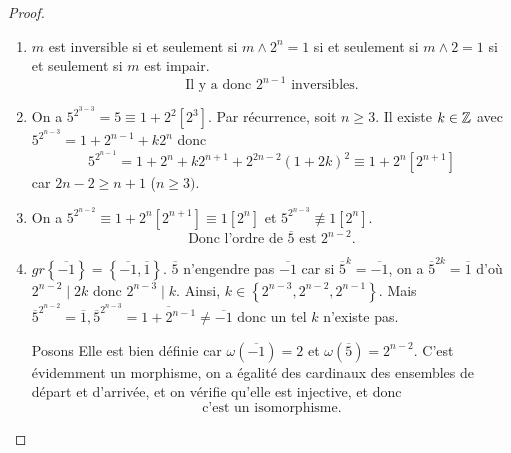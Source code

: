 \documentclass[12pt]{article}
\begin{document}
\begin{proof}
	\phantom{}
	\begin{enumerate}
		\item $m$ est inversible si et seulement si $m\wedge 2^{n}=1$ si et seulement si $m\wedge 2=1$ si et seulement si $m$ est impair. 
		\begin{equation}
			\boxed{\text{Il y a donc }2^{n-1}\text{ inversibles.}}
		\end{equation}
		\item On a $5^{2^{3-3}}=5\equiv1+2^{2}[2^{3}]$. Par récurrence, soit $n\geqslant3$. Il existe $k\in\mathbb{Z}$ avec $5^{2^{n-3}}=1+2^{n-1}+k2^{n}$ donc 
		\begin{equation}
			\boxed{
			5^{2^{n-1}}=1+2^{n}+k2^{n+1}+2^{2n-2}(1+2k)^{2}\equiv 1+2^{n}[2^{n+1}]}
		\end{equation}
		car $2n-2\geqslant n+1$ ($n\geqslant3)$.

		\item On a $5^{2^{n-2}}\equiv 1+2^{n}[2^{n+1}]\equiv 1[2^{n}]$ et $5^{2^{n-3}}\not\equiv1[2^{n}]$. 
		\begin{equation}
			\boxed{\text{Donc l'ordre de }\overline{5}\text{ est }2^{n-2}.}
		\end{equation}
		
		\item $gr\left\{\overline{-1}\right\}=\left\{\overline{-1},\overline{1}\right\}$. $\overline{5}$ n'engendre pas $\overline{-1}$ car si $\overline{5}^{k}=\overline{-1}$, on a $\overline{5}^{2k}=\overline{1}$ d'où $2^{n-2}\mid 2k$ donc $2^{n-3}\mid k$. Ainsi, $k\in\left\{2^{n-3},2^{n-2},2^{n-1}\right\}$. Mais $\overline{5}^{2^{n-2}}=\overline{1},\overline{5}^{2^{n-3}}=\overline{1+2^{n-1}}\neq\overline{-1}$ donc un tel $k$ n'existe pas.
		
		Posons 
		Elle est bien définie car $\omega(\overline{-1})=2$ et $\omega(\overline{5})=2^{n-2}$. C'est évidemment un morphisme, on a égalité des cardinaux des ensembles de départ et d'arrivée, et on vérifie qu'elle est injective, et donc 
		\begin{equation}
			\boxed{\text{c'est un isomorphisme.}}
		\end{equation}
	\end{enumerate}
\end{proof}
\end{document}
